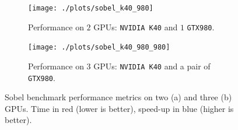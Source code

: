 \begin{figure}
	\begin{subfigure}{1.0\textwidth}
		\caption{Performance on $2$ GPUs: \texttt{NVIDIA K40} and $1$ \texttt{GTX980}.}
		\texttt{[image: ./plots/sobel\_k40\_980]}
		\label{fig:sobel_k40_980}
	\end{subfigure}		
	\endminipage \hfill
	\vspace{5mm}
	\begin{subfigure}{1.0\textwidth}
		\texttt{[image: ./plots/sobel\_k40\_980\_980]}
		\caption{Performance on $3$ GPUs: \texttt{NVIDIA K40} and a pair of \texttt{GTX980}.}
		\label{fig:sobel_k40_980_980}
	\end{subfigure}
	\endminipage\hfill
	\caption[Sobel benchmark performance metrics.]{Sobel benchmark performance metrics on two (a) and three (b) GPUs. Time in red (lower is better), speed-up in blue (higher is better).}
	\label{fig:sobel_performance_charts}
\end{figure}
